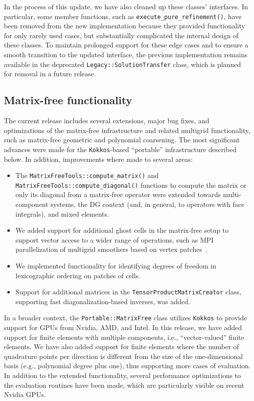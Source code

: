 \documentclass{ansarticle-preprint}
\newcommand{\specialword}[1]{\texttt{#1}}
\newcommand{\kokkos}{{\specialword{Kokkos}}\xspace}
\begin{document}
In the process of this update, we have also cleaned up these classes'
interfaces. In particular, some member functions, such as
\texttt{execute\_pure\_refinement()}, have been removed from the new
implementation because they provided functionality for only rarely
used cases, but substantially complicated the internal design of these
classes. To maintain prolonged support for these edge cases and to ensure
a smooth transition to the updated interface, the previous implementation
remains available in the deprecated \texttt{Legacy::SolutionTransfer} class,
which is planned for removal in a future release.


\subsection{Matrix-free functionality}
\label{subsec:matrixfree}

The current release includes several extensions, major bug fixes, and optimizations of the
matrix-free infrastructure and related multigrid functionality, such as
matrix-free geometric and polynomial coarsening. The most significant advances were made for the \kokkos-based
``portable'' infrastructure described below. In addition, improvements where
made to several areas:
\begin{itemize}
\item The \texttt{MatrixFreeTools::compute\_matrix()} and
  \texttt{MatrixFreeTools::compute\_diagonal()} functions to compute the
  matrix or only its diagonal from a matrix-free operator were extended
  towards multi-component systems, the DG context (and, in general, to operators
  with face integrals), and mixed elements.
\item We added support for additional ghost cells in the matrix-free setup to
  support vector access to a wider range of operations, such as MPI
  parallelization of multigrid smoothers based on vertex
  patches~\cite{Wichrowski2025smoothers}.
\item We implemented functionality for identifying degrees of freedom in lexicographic
  ordering on patches of cells.
\item Support for additional matrices in the
  \texttt{TensorProductMatrixCreator} class, supporting fast
  diagonalization-based inverses, was added.
\end{itemize}

In a broader context, the
\texttt{Portable::MatrixFree} class utilizes \kokkos to provide support for GPUs from
Nvidia, AMD, and Intel. In this release, we have added support for finite
elements with multiple components, i.e., ``vector-valued'' finite elements. We have
also added support for finite elements where the number
of quadrature points per direction is different from the size of the
one-dimensional basis (e.g., polynomial degree plus one), thus supporting more
cases of evaluation. In addition to the extended functionality, several
performance optimizations to the evaluation routines have been made, which are
particularly visible on recent Nvidia GPUs.
\end{document}
